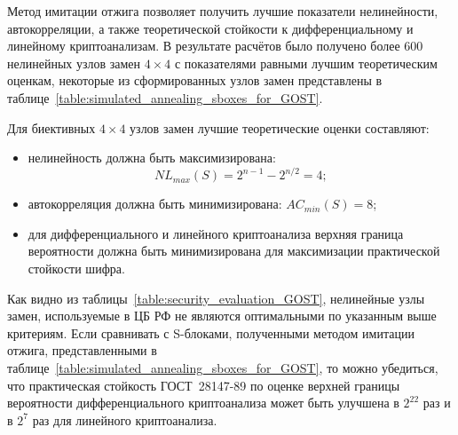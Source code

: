 Метод имитации отжига позволяет получить лучшие показатели нелинейности,
автокорреляции, а также теоретической стойкости к дифференциальному и линейному
криптоанализам. В результате расчётов было получено более 600 нелинейных узлов
замен $4 \times 4$ с показателями равными лучшим теоретическим оценкам, некоторые
из сформированных узлов замен представлены в
таблице~\ref{table:simulated_annealing_sboxes_for_GOST}.

Для биективных $4 \times 4$ узлов замен лучшие теоретические оценки составляют:

\begin{itemize}
    \item нелинейность \cite{Heys} должна быть максимизирована: $$NL_{max}(S) = 2^{n - 1} - 2^{n/2} = 4;$$
    \item автокорреляция должна быть минимизирована: $AC_{min}(S) = 8$;
    \item для дифференциального и линейного криптоанализа верхняя граница вероятности
    должна быть минимизирована для максимизации практической стойкости шифра.
\end{itemize}

Как видно из таблицы~\ref{table:security_evaluation_GOST}, нелинейные узлы
замен, используемые в ЦБ РФ не являются оптимальными по указанным выше
критериям. Если сравнивать с S-блоками, полученными методом имитации отжига,
представленными в таблице~\ref{table:simulated_annealing_sboxes_for_GOST}, то
можно убедиться, что практическая стойкость ГОСТ~28147-89 по оценке верхней
границы вероятности дифференциального криптоанализа может быть улучшена в
$2^{22}$ раз и в $2^7$ раз для линейного криптоанализа.

